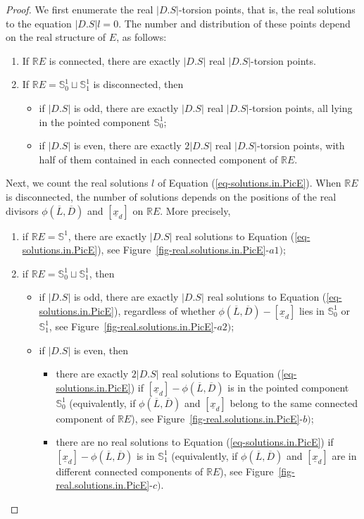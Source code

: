 \documentclass[11pt]{amsart}
\numberwithin{equation}{section}
\theoremstyle{definition}
\theoremstyle{plain}
\theoremstyle{remark}
\newcommand{\R}{\mathbb{R}}
\begin{document}
 \begin{proof}
We first enumerate the real $|D.S|$-torsion points, that is, the real solutions to the equation $|D.S|l=0$. The number and distribution of these points depend on the real structure of $E$, as follows:
  \begin{enumerate}[(1)]
 \item If $\R E$ is connected, there are exactly $|D.S|$  real $|D.S|$-torsion points.
 \item If $\R E=\mathbb{S}^1_0\sqcup \mathbb{S}^1_1$ is disconnected, then 
\begin{itemize}
\item if $|D.S|$ is odd, there are exactly $|D.S|$ real $|D.S|$-torsion points, all lying in the pointed component  $\mathbb{S}^1_0$; 
\item if $|D.S|$ is even, there are exactly $2|D.S|$  real $|D.S|$-torsion points, with half of them contained in each connected component of $\R E$.
\end{itemize} 
 \end{enumerate}
Next, we count the real solutions $l$ of Equation (\ref{eq-solutions.in.PicE}). When $\R E$ is disconnected, the number of solutions depends on the positions of the real divisors $\phi(\overline{L},\overline{D})$ and $[\underline{x}_d]$ on $\R E$. More precisely,
\begin{enumerate}[(1)]
\item if $\R E=\mathbb{S}^1$, there are exactly $|D.S|$ real solutions to Equation (\ref{eq-solutions.in.PicE}), see Figure~\ref{fig-real.solutions.in.PicE}-$a1)$;
\item if $\R E=\mathbb{S}^1_0\sqcup \mathbb{S}^1_1$, then
\begin{itemize}
\item  if $|D.S|$ is odd, there are exactly $|D.S|$ real solutions to Equation (\ref{eq-solutions.in.PicE}),
regardless of whether $\phi(\overline{L}, \overline{D}) - [\underline{x}_d]$ lies in $\mathbb{S}^1_0$ or $\mathbb{S}^1_1$, see Figure~\ref{fig-real.solutions.in.PicE}-$a2)$;
\item if $|D.S|$ is even, then 
\begin{itemize}
\item there are exactly $2|D.S|$ real solutions to Equation (\ref{eq-solutions.in.PicE}) if $[\underline{x}_d]-\phi(\overline{L},\overline{D})$ is in the pointed component $\mathbb{S}^1_0$ (equivalently, if $\phi(\overline{L},\overline{D})$ and $[\underline{x}_d]$ belong to the same connected component of $\mathbb{R} E$), see Figure~\ref{fig-real.solutions.in.PicE}-$b)$;
\item there are no real solutions to Equation (\ref{eq-solutions.in.PicE}) if  $[\underline{x}_d]-\phi(\overline{L},\overline{D})$ is in $\mathbb{S}^1_1$ (equivalently, if $\phi(\overline{L},\overline{D})$ and $[\underline{x}_d]$ are in different connected components of $\R E$), see Figure~\ref{fig-real.solutions.in.PicE}-$c)$.
\end{itemize}
\end{itemize}
\end{enumerate}


\end{proof}
\end{document}
